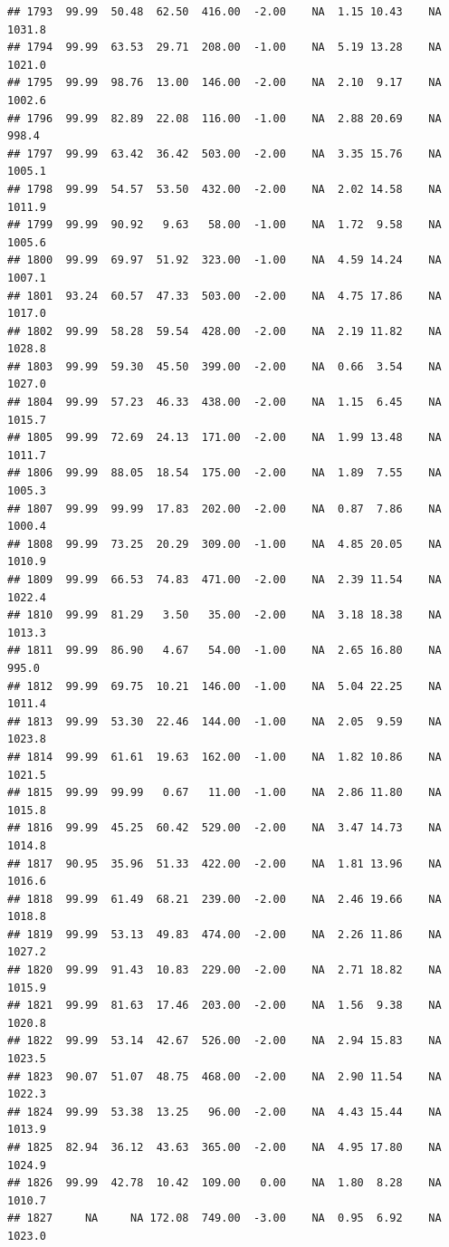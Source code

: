 \documentclass{article}\usepackage{graphicx, color}
\makeatletter
\newenvironment{kframe}{%
 \def\at@end@of@kframe{}%
 \ifinner\ifhmode%
  \def\at@end@of@kframe{\end{minipage}}%
  \begin{minipage}{\columnwidth}%
 \fi\fi%
 \def\FrameCommand##1{\hskip\@totalleftmargin \hskip-\fboxsep
 \colorbox{shadecolor}{##1}\hskip-\fboxsep
     \hskip-\linewidth \hskip-\@totalleftmargin \hskip\columnwidth}%
 \MakeFramed {\advance\hsize-\width
   \@totalleftmargin\z@ \linewidth\hsize
   \@setminipage}}%
 {\par\unskip\endMakeFramed%
 \at@end@of@kframe}
\newenvironment{knitrout}{}{} %
\makeatother
\begin{document}
\begin{knitrout}
\begin{kframe}
\begin{verbatim}
## 1793  99.99  50.48  62.50  416.00  -2.00    NA  1.15 10.43    NA 1031.8
## 1794  99.99  63.53  29.71  208.00  -1.00    NA  5.19 13.28    NA 1021.0
## 1795  99.99  98.76  13.00  146.00  -2.00    NA  2.10  9.17    NA 1002.6
## 1796  99.99  82.89  22.08  116.00  -1.00    NA  2.88 20.69    NA  998.4
## 1797  99.99  63.42  36.42  503.00  -2.00    NA  3.35 15.76    NA 1005.1
## 1798  99.99  54.57  53.50  432.00  -2.00    NA  2.02 14.58    NA 1011.9
## 1799  99.99  90.92   9.63   58.00  -1.00    NA  1.72  9.58    NA 1005.6
## 1800  99.99  69.97  51.92  323.00  -1.00    NA  4.59 14.24    NA 1007.1
## 1801  93.24  60.57  47.33  503.00  -2.00    NA  4.75 17.86    NA 1017.0
## 1802  99.99  58.28  59.54  428.00  -2.00    NA  2.19 11.82    NA 1028.8
## 1803  99.99  59.30  45.50  399.00  -2.00    NA  0.66  3.54    NA 1027.0
## 1804  99.99  57.23  46.33  438.00  -2.00    NA  1.15  6.45    NA 1015.7
## 1805  99.99  72.69  24.13  171.00  -2.00    NA  1.99 13.48    NA 1011.7
## 1806  99.99  88.05  18.54  175.00  -2.00    NA  1.89  7.55    NA 1005.3
## 1807  99.99  99.99  17.83  202.00  -2.00    NA  0.87  7.86    NA 1000.4
## 1808  99.99  73.25  20.29  309.00  -1.00    NA  4.85 20.05    NA 1010.9
## 1809  99.99  66.53  74.83  471.00  -2.00    NA  2.39 11.54    NA 1022.4
## 1810  99.99  81.29   3.50   35.00  -2.00    NA  3.18 18.38    NA 1013.3
## 1811  99.99  86.90   4.67   54.00  -1.00    NA  2.65 16.80    NA  995.0
## 1812  99.99  69.75  10.21  146.00  -1.00    NA  5.04 22.25    NA 1011.4
## 1813  99.99  53.30  22.46  144.00  -1.00    NA  2.05  9.59    NA 1023.8
## 1814  99.99  61.61  19.63  162.00  -1.00    NA  1.82 10.86    NA 1021.5
## 1815  99.99  99.99   0.67   11.00  -1.00    NA  2.86 11.80    NA 1015.8
## 1816  99.99  45.25  60.42  529.00  -2.00    NA  3.47 14.73    NA 1014.8
## 1817  90.95  35.96  51.33  422.00  -2.00    NA  1.81 13.96    NA 1016.6
## 1818  99.99  61.49  68.21  239.00  -2.00    NA  2.46 19.66    NA 1018.8
## 1819  99.99  53.13  49.83  474.00  -2.00    NA  2.26 11.86    NA 1027.2
## 1820  99.99  91.43  10.83  229.00  -2.00    NA  2.71 18.82    NA 1015.9
## 1821  99.99  81.63  17.46  203.00  -2.00    NA  1.56  9.38    NA 1020.8
## 1822  99.99  53.14  42.67  526.00  -2.00    NA  2.94 15.83    NA 1023.5
## 1823  90.07  51.07  48.75  468.00  -2.00    NA  2.90 11.54    NA 1022.3
## 1824  99.99  53.38  13.25   96.00  -2.00    NA  4.43 15.44    NA 1013.9
## 1825  82.94  36.12  43.63  365.00  -2.00    NA  4.95 17.80    NA 1024.9
## 1826  99.99  42.78  10.42  109.00   0.00    NA  1.80  8.28    NA 1010.7
## 1827     NA     NA 172.08  749.00  -3.00    NA  0.95  6.92    NA 1023.0

\end{verbatim}
\end{kframe}
\end{knitrout}
\end{document}
